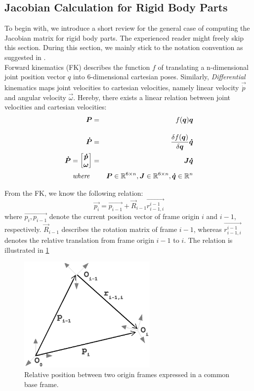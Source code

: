 \subsection{Jacobian Calculation for Rigid Body Parts}
To begin with, we introduce a short review for the general case of computing the Jacobian matrix for rigid body parts. The experienced reader might freely skip this section. During this section, we mainly stick to the notation convention
as suggested in \cite{citeulike:1090825}. \\

Forward kinematics (FK) describes the function $f$ of translating a n-dimensional joint position vector $q$ into 6-dimensional cartesian poses. Similarly, \textit{Differential} kinematics maps joint velocities to cartesian velocities, namely linear velocity $\vec{\dot{p}}$ and angular velocity $\vec{\omega}$. Hereby, there exists a linear relation between joint velocities and cartesian velocities:
\begin{eqnarray}
\vec{P} &=& f(\vec{q}) \vec{q} \notag \\[1em]
\vec{\dot{P}} &=& \frac{\delta f(\vec{q})}{\delta \vec{q}} \vec{\dot{q}} \notag \\
\vec{\dot{P}} = 
\begin{bmatrix}
\vec{\dot{p}} \\
\vec{\omega} 
\end{bmatrix} &=& \vec{J} \vec{\dot{q}} \notag \\
\textit{ where } && \vec{P} \in \mathbb{R}^{6 \times n} , \vec{J} \in \mathbb{R}^{6 \times n}, \vec{\dot{q}} \in \mathbb{R}^n\label{eqn:jacobianmap}
\end{eqnarray}

From the FK, we know the following relation:
\begin{equation}
\vec{p_i} = \vec{p_{i-1}} + \vec{R}_{i-1}\vec{r_{i-1,i}^{i-1}} \label{eqn:linkposition}
\end{equation}
where $\vec{p_i,p_{i-1}}$ denote the current position vector of frame origin $i$ and $i-1$, respectively. $\vec{R}_{i-1}$ describes the rotation matrix of frame $i-1$, whereas $\vec{r_{i-1,i}^{i-1}}$ denotes the relative translation from frame origin $i-1$ to $i$. The relation is illustrated in \ref{fig:linkvelocity}

\begin{figure}[h!]
  \centering
    \includegraphics[width=0.6\textwidth]{../figures/link_velocity.eps}
    \caption{Relative position between two origin frames expressed in a common base frame.}
    \label{fig:linkvelocity}
\end{figure}

